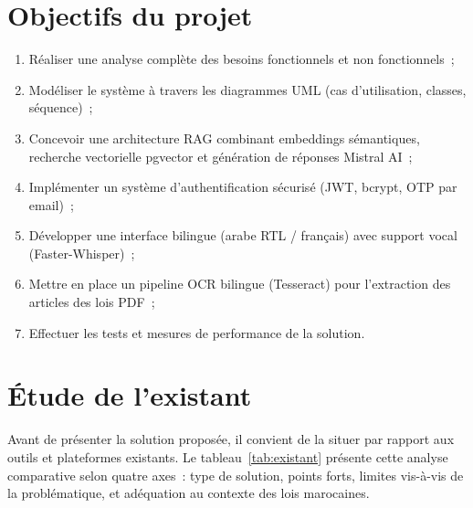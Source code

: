 \documentclass[12pt,a4paper]{report}
\begin{document}
\section{Objectifs du projet}

\begin{enumerate}[label=\arabic*.]
    \item Réaliser une analyse complète des besoins fonctionnels et non fonctionnels~;
    \item Modéliser le système à travers les diagrammes UML (cas d'utilisation, classes, séquence)~;
    \item Concevoir une architecture RAG combinant embeddings sémantiques, recherche vectorielle pgvector et génération de réponses Mistral AI~;
    \item Implémenter un système d'authentification sécurisé (JWT, bcrypt, OTP par email)~;
    \item Développer une interface bilingue (arabe RTL / français) avec support vocal (Faster-Whisper)~;
    \item Mettre en place un pipeline OCR bilingue (Tesseract) pour l'extraction des articles des lois PDF~;
    \item Effectuer les tests et mesures de performance de la solution.
\end{enumerate}

\section{Étude de l'existant}
\label{sec:existant}

Avant de présenter la solution proposée, il convient de la situer par rapport aux outils et plateformes existants. Le tableau~\ref{tab:existant} présente cette analyse comparative selon quatre axes~: type de solution, points forts, limites vis-à-vis de la problématique, et adéquation au contexte des lois marocaines.
\end{document}
